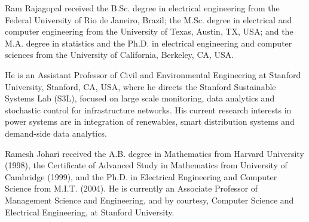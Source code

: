 \documentclass[journal]{IEEEtran}
\begin{document}
\begin{IEEEbiography}{Ram Rajagopal} received the B.Sc. degree in electrical
engineering from the Federal University of Rio
de Janeiro, Brazil; the M.Sc. degree in electrical and
computer engineering from the University of Texas,
Austin, TX, USA; and the M.A. degree in statistics
and the Ph.D. in electrical engineering and computer
sciences from the University of California, Berkeley,
CA, USA.

He is an Assistant Professor of Civil and Environmental
Engineering at Stanford University, Stanford,
CA, USA, where he directs the Stanford Sustainable
Systems Lab (S3L), focused on large scale monitoring, data analytics and stochastic
control for infrastructure networks.
His current research interests in power systems are in integration of renewables,
smart distribution systems and demand-side data analytics.
\end{IEEEbiography}

\begin{IEEEbiography}{Ramesh Johari} received the A.B. degree
in Mathematics from Harvard University (1998),
the Certificate of Advanced Study in Mathematics
from University of Cambridge (1999), and the Ph.D.
in Electrical Engineering and Computer Science
from M.I.T. (2004). He is currently an Associate
Professor of Management Science and Engineering,
and by courtesy, Computer Science and Electrical
Engineering, at Stanford University.
\end{IEEEbiography}
\end{document}

